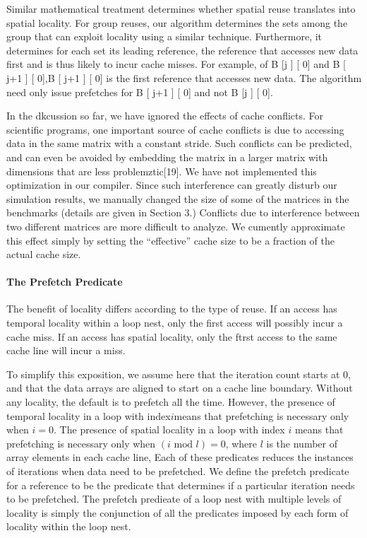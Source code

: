 Similar mathematical treatment determines whether spatial reuse
translates into spatial locality. For group reuses, our algorithm
determines the sets among the group that can exploit locality using
a similar technique. Furthermore, it determines for each set its
leading reference, the reference that accesses new data first and is
thus likely to incur cache misses. For example, of B [j ] [ 0] and
B [ j+1 ] [ 0],B [ j+1 ] [ 0] is the first reference that accesses new
data. The algorithm need only issue prefetches for B [ j+1 ] [ 0]
and not B [j ] [ 0].


In the dkcussion so far, we have ignored the effects of cache
conflicts. For scientific programs, one important source of cache
conflicts is due to accessing data in the same matrix with a constant
stride. Such conflicts can be predicted, and can even be avoided by
embedding the matrix in a larger matrix with dimensions that are
less problemztic[19]. We have not implemented this optimization in
our compiler. Since such interference can greatly disturb our simulation results, we manually changed the size of some of the matrices
in the benchmarks (details are given in Section 3.) Conflicts due
to interference between two different matrices are more difficult to
analyze. We cumently approximate this effect simply by setting the
“effective” cache size to be a fraction of the actual cache size.


\paragraph{The Prefetch Predicate}

The benefit of locality differs according to the type of reuse. If an
access has temporal locality within a loop nest, only the first access
will possibly incur a cache miss. If an access has spatial locality,
only the ftrst access to the same cache line will incur a miss.

To simplify this exposition, we assume here that the iteration
count starts at 0, and that the data arrays are aligned to start on
a cache line boundary. Without any locality, the default is to
prefetch all the time. However, the presence of temporal locality 
in a loop with index$i$means that prefetching is necessary only
when $i = 0$. The presence of spatial locality in a loop with index
$i$ means that prefetching is necessary only when $(i \text{ mod } l) = 0$,
where $l$ is the number of array elements in each cache line, Each of
these predicates reduces the instances of iterations when data need
to be prefetched. We define the prefetch predicate for a reference
to be the predicate that determines if a particular iteration needs to
be prefetched. The prefetch predieate of a loop nest with multiple levels of locality is simply the conjunction of all the predicates
imposed by each form of locality within the loop nest.

